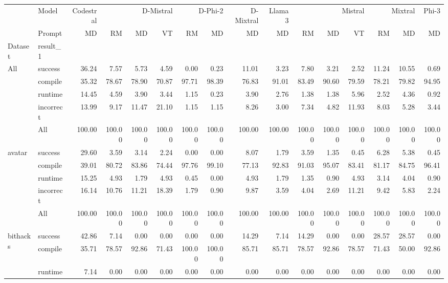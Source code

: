 \begin{tabular}{llrrrrrrrrrrrrrr}
\toprule
 & Model & Codestral & \multicolumn{3}{r}{D-Mistral} & \multicolumn{2}{r}{D-Phi-2} & D-Mixtral & Llama 3 & \multicolumn{3}{r}{Mistral} & \multicolumn{2}{r}{Mixtral} & Phi-3 \\
 & Prompt & MD & RM & MD & VT & RM & MD & MD & MD & RM & MD & VT & RM & MD & MD \\
Dataset & result_1 &  &  &  &  &  &  &  &  &  &  &  &  &  &  \\
\midrule
\multirow[t]{5}{*}{All} & success & 36.24 & 7.57 & 5.73 & 4.59 & 0.00 & 0.23 & 11.01 & 3.23 & 7.80 & 3.21 & 2.52 & 11.24 & 10.55 & 0.69 \\
 & compile & 35.32 & 78.67 & 78.90 & 70.87 & 97.71 & 98.39 & 76.83 & 91.01 & 83.49 & 90.60 & 79.59 & 78.21 & 79.82 & 94.95 \\
 & runtime & 14.45 & 4.59 & 3.90 & 3.44 & 1.15 & 0.23 & 3.90 & 2.76 & 1.38 & 1.38 & 5.96 & 2.52 & 4.36 & 0.92 \\
 & incorrect & 13.99 & 9.17 & 11.47 & 21.10 & 1.15 & 1.15 & 8.26 & 3.00 & 7.34 & 4.82 & 11.93 & 8.03 & 5.28 & 3.44 \\
 & All & 100.00 & 100.00 & 100.00 & 100.00 & 100.00 & 100.00 & 100.00 & 100.00 & 100.00 & 100.00 & 100.00 & 100.00 & 100.00 & 100.00 \\
\cline{1-16}
\multirow[t]{5}{*}{avatar} & success & 29.60 & 3.59 & 3.14 & 2.24 & 0.00 & 0.00 & 8.07 & 1.79 & 3.59 & 1.35 & 0.45 & 6.28 & 5.38 & 0.45 \\
 & compile & 39.01 & 80.72 & 83.86 & 74.44 & 97.76 & 99.10 & 77.13 & 92.83 & 91.03 & 95.07 & 83.41 & 81.17 & 84.75 & 96.41 \\
 & runtime & 15.25 & 4.93 & 1.79 & 4.93 & 0.45 & 0.00 & 4.93 & 1.79 & 1.35 & 0.90 & 4.93 & 3.14 & 4.04 & 0.90 \\
 & incorrect & 16.14 & 10.76 & 11.21 & 18.39 & 1.79 & 0.90 & 9.87 & 3.59 & 4.04 & 2.69 & 11.21 & 9.42 & 5.83 & 2.24 \\
 & All & 100.00 & 100.00 & 100.00 & 100.00 & 100.00 & 100.00 & 100.00 & 100.00 & 100.00 & 100.00 & 100.00 & 100.00 & 100.00 & 100.00 \\
\cline{1-16}
\multirow[t]{5}{*}{bithacks} & success & 42.86 & 7.14 & 0.00 & 0.00 & 0.00 & 0.00 & 14.29 & 7.14 & 14.29 & 0.00 & 0.00 & 28.57 & 28.57 & 0.00 \\
 & compile & 35.71 & 78.57 & 92.86 & 71.43 & 100.00 & 100.00 & 85.71 & 85.71 & 78.57 & 92.86 & 78.57 & 71.43 & 50.00 & 92.86 \\
 & runtime & 7.14 & 0.00 & 0.00 & 0.00 & 0.00 & 0.00 & 0.00 & 0.00 & 0.00 & 0.00 & 0.00 & 0.00 & 0.00 & 0.00 \\

\end{tabular}
